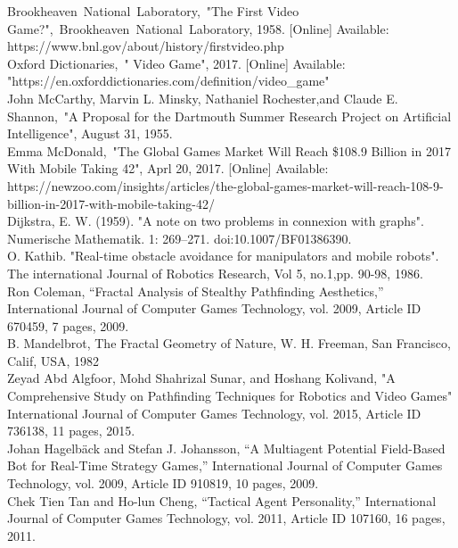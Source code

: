 \begin{thebibliography}{1}
	

	Brookheaven~National~Laboratory,~"The First Video Game?",~Brookheaven~National~Laboratory, 1958. [Online] Available: https://www.bnl.gov/about/history/firstvideo.php
\\
	Oxford Dictionaries,~" Video Game", 2017. [Online] Available: "https://en.oxforddictionaries.com/definition/video\_game"
\\

	John McCarthy, Marvin L. Minsky, Nathaniel Rochester,and Claude E. Shannon,~"A Proposal for the Dartmouth Summer Research Project on Artificial Intelligence", August 31, 1955.
\\
	Emma McDonald,~"The Global Games Market Will Reach \$108.9 Billion in 2017 With Mobile Taking 42", Aprl 20, 2017. [Online] Available: https://newzoo.com/insights/articles/the-global-games-market-will-reach-108-9-billion-in-2017-with-mobile-taking-42/
\\
	Dijkstra, E. W. (1959). "A note on two problems in connexion with graphs". Numerische Mathematik. 1: 269–271. doi:10.1007/BF01386390.
\\
 O. Kathib. "Real-time obstacle avoidance for manipulators and mobile robots". The international Journal of Robotics Research, Vol 5, no.1,pp. 90-98, 1986.
\\
Ron Coleman, “Fractal Analysis of Stealthy Pathfinding Aesthetics,” International Journal of Computer Games Technology, vol. 2009, Article ID 670459, 7 pages, 2009.
\\
B. Mandelbrot, The Fractal Geometry of Nature, W. H. Freeman, San Francisco, Calif, USA, 1982
\\
Zeyad Abd Algfoor, Mohd Shahrizal Sunar, and Hoshang Kolivand, "A Comprehensive Study on Pathfinding Techniques for Robotics and Video Games" International Journal of Computer Games Technology, vol. 2015, Article ID 736138, 11 pages, 2015.
\\
 Johan Hagelbäck and Stefan J. Johansson, “A Multiagent Potential Field-Based Bot for Real-Time Strategy Games,” International Journal of Computer Games Technology, vol. 2009, Article ID 910819, 10 pages, 2009. 
\\
Chek Tien Tan and Ho-lun Cheng, “Tactical Agent Personality,” International Journal of Computer Games Technology, vol. 2011, Article ID 107160, 16 pages, 2011.

\end{thebibliography}